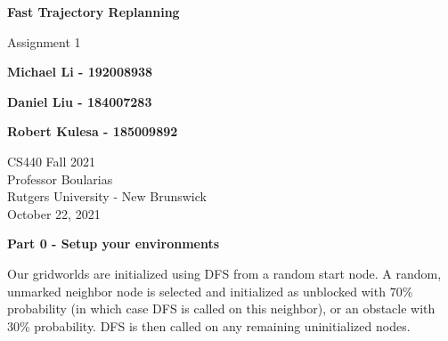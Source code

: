 \documentclass[11pt]{article}
\begin{document}
    \begin{titlepage}
        \begin{center}
            \vspace{1cm}

            \Huge
            \textbf{Fast Trajectory Replanning}

            \vspace{0.5cm}
            \LARGE
            Assignment 1

            \vspace{1cm}

            \textbf{Michael Li - 192008938}

            \textbf{Daniel Liu - 184007283}

            \textbf{Robert Kulesa - 185009892}


            \vfill


            \vspace{0.8cm}

            \Large
            CS440 Fall 2021\\
            Professor Boularias\\
            Rutgers University - New Brunswick\\
            October 22, 2021

        \end{center}
    \end{titlepage}
    \begin{center}
        \Large
        \textbf{Part 0 - Setup your environments}
    \end{center}
    \normalsize
    Our gridworlds are initialized using DFS from a random start node.
    A random, unmarked neighbor node is selected and initialized as unblocked with 70\% probability (in which case DFS is called on this neighbor), or an obstacle with 30\% probability.
    DFS is then called on any remaining uninitialized nodes.
\end{document}
